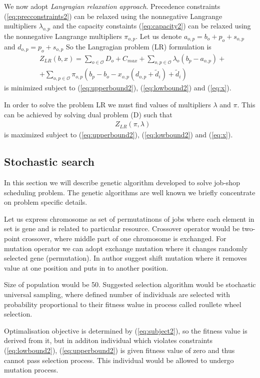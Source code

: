 \documentclass[a4paper,journal,twocolumn]{IEEEtran}
\begin{document}
We now adopt \emph{Langragian relaxation approach}. 
Precedence constraints (\ref{eq:precconstraints2}) can be relaxed using the nonnegative Langrange multipliers $\lambda_{o,p}$
and the capacity constaints (\ref{eq:capacity2}) can be relaxed using the nonnegative Langrange multipliers $\pi_{o,p}$.
Let us denote $a_{o,p} = b_o + p_o + s_{o,p}$ and $d_{o,p} = p_o + s_{o,p}$
So the Langragian problem (LR) formulation is 
\begin{align}
	& Z_{LR}\left(b,x\right)=\sum_{o\in\mathcal{O}}D_o + C_{max} + \sum_{o,p\in\mathcal{O}}\lambda_o\left(b_p-a_{o,p}\right) + \nonumber \\
	& +\sum_{o,p\in\mathcal{O}}\pi_{o,p}\left(b_p-b_o-x_{o,p}(d_{o,p}+\tilde{d}_i)+\tilde{d}_i\right) 
\end{align}
is minimized subject to (\ref{eq:upperbound2}), (\ref{eq:lowbound2}) and (\ref{eq:x}).

In order to solve the problem LR we must find values of multipliers $\lambda$ and $\pi$. This can be achieved by
solving dual problem (D) such that 
\begin{align}
	& Z_{LR}\left(\pi,\lambda\right)\nonumber
\end{align}
is maximized subject to (\ref{eq:upperbound2}), (\ref{eq:lowbound2}) and (\ref{eq:x}).

\subsection{Stochastic search}
In this section we will describe genetic algorithm developed to solve job-shop scheduling problem.
The genetic algorithms are well known we briefly concentrate on problem specific details.

Let us express chromosome as set of permutatinons of jobs where each element in set is gene and is related to particular resource.
Crossover operator would be two-point crossover, where middle part of one chromosome is exchanged.
For mutation operator we can adopt exchange mutation where it changes randomly selected gene (permutation). In \cite{Sed} author suggest
shift mutation where it removes value at one position and puts in to another position.

Size of population would be 50. Suggested selection algorithm would be stochastic universal sampling, where defined number of individuals
are selected with probability proportional to their fitness walue in process called roullete wheel selection.

Optimalisation objective is determined by (\ref{eq:subject2}), so the fitness value is derived from it, but in additon
individual which violates constraints (\ref{eq:lowbound2}), (\ref{eq:upperbound2}) is given fitness value of zero
and thus cannot pass selection process. This individual would be allowed to undergo mutation process.
\end{document}
